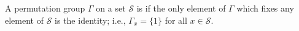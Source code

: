 A permutation group $\Gamma$ on a set $\mathcal{S}$ is  if the only element of $\Gamma$ which fixes any element of $\mathcal{S}$ is the identity; i.e., $\Gamma_x = \{1\}$ for all $x \in \mathcal{S}$.